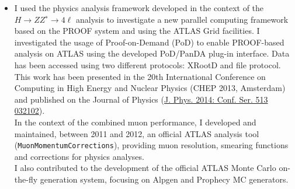 \begin{cvinterests}
{\begin{itemize}[labelwidth=0.05in,align=right,leftmargin=!,labelsep=0pt,
itemsep=0.0em]
\item[] I used the physics analysis framework developed in the context of the 
$H\to ZZ^{∗}\to 4\ell$ analysis to investigate a new parallel computing
framework based on the PROOF system and using the ATLAS Grid facilities.
I investigated the usage of Proof-on-Demand (PoD) to enable PROOF-based analysis
on ATLAS using the developed PoD/PanDA plug-in interface. Data has been
accessed using two different protocols: XRootD and file protocol. This work
has been presented in the 20th International Conference on Computing in High
Energy and Nuclear Physics (CHEP 2013, Amsterdam) and published on the Journal
of Physics (\href{http://iopscience.iop.org/1742-6596/513/3/032102}{J. Phys. 2014: Conf. Ser. 513 032102}).\\
In the context of the combined muon performance, I developed and maintained,
between 2011 and 2012, an official ATLAS analysis tool
(\texttt{MuonMomentumCorrections}), providing muon resolution, smearing
functions and corrections for physics analyses.\\
I also contributed to the development of the official ATLAS Monte Carlo
on-the-fly generation system, focusing on Alpgen and Prophecy MC generators.
\end{itemize}
%
}

\end{cvinterests}
